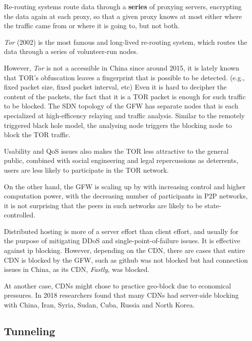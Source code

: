 \documentclass[nonacm,sigplan,screen]{acmart}
\begin{document}
Re-routing systems route data through a \textbf{series} of proxying
servers, encrypting the data again at each proxy, so that a given proxy
knows at most either where the traffic came from or where it is going
to, but not both.

\emph{Tor} (2002) is the most famous and long-lived re-routing system,
which routes the data through a series of volunteer-run nodes.

However, \emph{Tor} is not a accessible in China since around 2015, it
is lately known that TOR's obfuscation leaves a fingerprint that is
possible to be detected. (e.g., fixed packet size, fixed packet
interval, etc) Even it is hard to decipher the content of the packets,
the fact that it is a TOR packet is enough for such traffic to be
blocked. \cite{50_tor_finger} The SDN topology of the GFW has separate
nodes that is each specialized at high-efficency relaying and traffic
analysis. Similar to the remotely triggered black hole model, the
analysing node triggers the blocking node to block the TOR traffic.

Usability and QoS issues also makes the TOR less attractive to the
general public, combined with social engineering and legal repercussions
as deterrents, users are less likely to participate in the TOR network.

On the other hand, the GFW is scaling up by with increasing control and
higher computation power, with the decreasing number of participants in
P2P networks, it is not surprising that the peers in such networks are
likely to be state-controlled.

Distributed hosting is more of a server effort than client effort, and
usually for the purpose of mitigating DDoS and single-point-of-failure
issues. It is effective against ip blocking.
However, depending on the CDN, there are cases that entire CDN is
blocked by the GFW, such as github was not blocked but had connection
issues in China, as its CDN, \emph{Fastly}, was blocked.
\cite{19_detect}

At another case, CDNs might chose to practice geo-block due to
economical pressures. In 2018 researchers found that many CDNs had
server-side blocking with China, Iran, Syria, Sudan, Cuba, Russia and
North Korea. \cite{51_CDN403}

\hypertarget{tunneling}{%
\subsection{Tunneling}\label{tunneling}}
\end{document}
